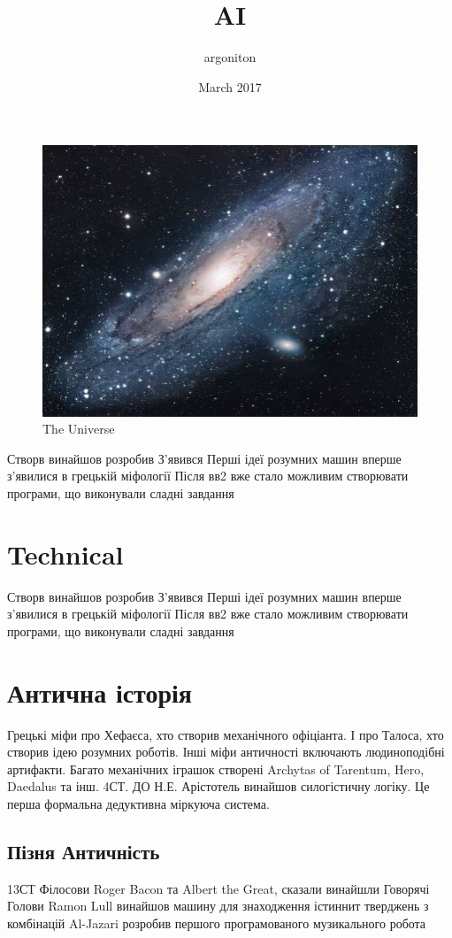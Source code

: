 \documentclass[12pt, letterpaper]{article}
\title{AI}
\author{argoniton}
\date{March 2017}
\begin{document}
\maketitle

\begin{figure}[h!]
\centering
\includegraphics[scale=1.7]{universe.jpg}
\caption{The Universe}
\label{fig:univerise}
\end{figure}

Створв винайшов розробив
З'явився
Перші ідеї розумних машин вперше з'явилися в грецькій міфології
Після вв2 вже стало можливим створювати програми, що виконували сладні завдання

\section{Technical}

Створв винайшов розробив
З'явився
Перші ідеї розумних машин вперше з'явилися в грецькій міфології
Після вв2 вже стало можливим створювати програми, що виконували сладні завдання

\section{Антична історія}
Грецькі міфи про Хефаєса, хто створив механічного офіціанта.
І про Талоса, хто створив ідею розумних роботів.
Інші міфи античності включають людиноподібні артифакти.
Багато механічних іграшок створені  Archytas of Tarentum, Hero, Daedalus та інш.
4СТ. ДО Н.Е.
Арістотель винайшов силогістичну логіку.
Це перша формальна дедуктивна міркуюча система.
\subsection{Пізня Античність}
13СТ
Філосови Roger Bacon та Albert the Great, сказали винайшли Говорячі Голови
Ramon Lull винайшов машину для знаходження істиннит тверджень з комбінацій
Al-Jazari розробив першого програмованого музикального робота
\end{document}
